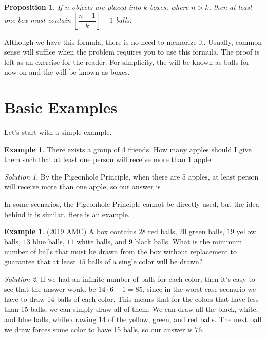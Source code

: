 \documentclass[l1pt]{article}
\theoremstyle{plain}
\newtheorem{prop}[thm]{Proposition}
\theoremstyle{definition}
\newtheorem{example}[thm]{Example}
\theoremstyle{remark}
\newtheorem*{solution}{Solution}
\begin{document}
\begin{mdframed}
    \begin{prop}
    If $n$ objects are placed into $k$ boxes, where $n>k$, then at least one box must contain $\left\lfloor \dfrac{n-1}{k} \right\rfloor + 1 $ balls.
    \end{prop}
\end{mdframed}

Although we have this formula, there is no need to memorize it. Usually, common sense will suffice when the problem requires you to use this formula. The proof is left as an exercise for the reader. For simplicity, the  will be known as balls for now on and the  will be known as boxes.

\section{Basic Examples}
Let's start with a simple example.

\begin{example}
There exists a group of 4 friends. How many apples should I give them such that at least one person will receive more than 1 apple.
\end{example}

\begin{solution}
By the Pigeonhole Principle, when there are 5 apples, at least person will receive more than one apple, so our answer is .
\end{solution}

\bigskip

In some scenarios, the Pigeonhole Principle cannot be directly used, but the idea behind it is similar. Here is an example.

\begin{example}
(2019 AMC) A box contains $28$ red balls, $20$ green balls, $19$ yellow balls, $13$ blue balls, $11$ white balls, and $9$ black balls. What is the minimum number of balls that must be drawn from the box without replacement to guarantee that at least $15$ balls of a single color will be drawn$?$
\end{example}

\begin{solution}
If we had an infinite number of balls for each color, then it's easy to see that the answer would be $14\cdot 6+1=85$, since in the worst case scenario we have to draw 14 balls of each color. This means that for the colors that have less than 15 balls, we can simply draw all of them. We can draw all the black, white, and blue balls, while drawing 14 of the yellow, green, and red balls. The next ball we draw forces some color to have 15 balls, so our answer is $\boxed{76}$.
\end{solution}
\end{document}
